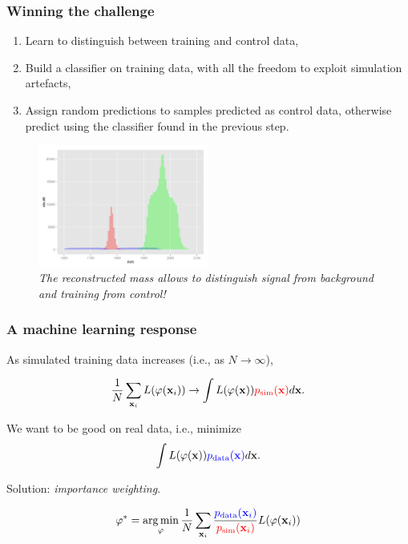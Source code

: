 \documentclass{beamer}
\DeclareMathOperator*{\argmin}{arg\,min}
\begin{document}

\begin{frame}
\frametitle{Winning the challenge}

\begin{enumerate}
\item Learn to distinguish between training and control data,
\item Build a classifier on training data, with all the freedom to exploit simulation artefacts,
\item Assign random predictions to samples predicted as control data, otherwise predict using the classifier found in the previous step.
\end{enumerate}

\begin{figure}
\centering
\includegraphics[width=0.5\textwidth]{figures/hole.png}\\
{\it The reconstructed mass allows to distinguish {\color{red} signal} from {\color{blue} background} and training from {\color{mygreen} control}!}
\end{figure}

\end{frame}


\begin{frame}
\frametitle{A machine learning response}

As simulated training data increases (i.e., as $N \to \infty$),

$$\frac{1}{N} \sum_{\mathbf{x}_i} L(\varphi(\mathbf{x}_i)) \to \int L(\varphi(\mathbf{x})) {\color{red} p_\text{sim}(\mathbf{x})} d\mathbf{x}.$$

We want to be good on real data, i.e., minimize
$$\int L(\varphi(\mathbf{x})) {\color{blue} p_\text{data}(\mathbf{x})} d\mathbf{x}.$$

Solution: {\it importance weighting}.

$$\varphi^* = \argmin_\varphi \frac{1}{N} \sum_{\mathbf{x}_i} \frac{\color{blue} p_\text{data}(\mathbf{x}_i)}{\color{red} p_\text{sim}(\mathbf{x}_i)}  L(\varphi(\mathbf{x}_i))$$

\end{frame}
\end{document}
